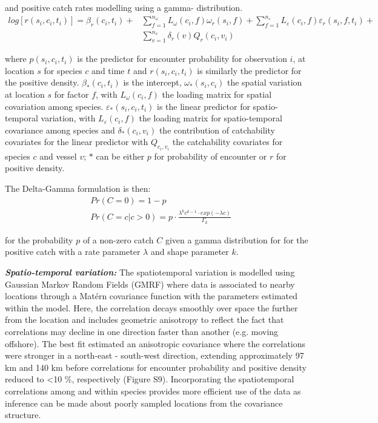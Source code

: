 \documentclass{nature}
\begin{document}
\begin{linenumbers}
and positive catch rates modelling using a gamma- distribution\cite{Thorson2015a}. 
		\begin{equation}
			\begin{split}
			log[r(s_{i},c_{i},t_{i})] = \beta_{r}(c_{i},t_{i}) +
			& \sum\limits_{f=1}^{n_{\omega}} L_{\omega}(c_{i},f)
			\omega_{r}(s_{i},f) +\sum\limits_{f=1}^{n_{\varepsilon}} 
			L_{\varepsilon}(c_{i},f) \varepsilon_{r}(s_{i},f,t_{i}) + \\
			& \sum\limits_{v=1}^{n_{v}}\delta_{r}(v) Q_{r}(c_{i}, v_{i})
			\end{split}
		\end{equation}

where $p(s_{i}, c_{i}, t_{i})$ is the predictor for encounter probability for
observation $i$, at location $s$ for species $c$ and time $t$ and $r(s_{i},
c_{i}, t_{i})$ is similarly the predictor for the positive density.
$\beta_{*}(c_{i},t_{i})$ is the intercept, $\omega_{*}(s_{i},c_{i})$ the
spatial variation at location $s$ for factor $f$, with $L_{\omega}(c_{i},f)$
the loading matrix for spatial covariation among species.
$\varepsilon_{*}(s_{i},c_{i},t_{i})$ is the linear predictor for
spatio-temporal variation, with $L_{\varepsilon}(c_{i}, f)$ the loading matrix
for spatio-temporal covariance among species and $\delta_{*}(c_{i}, v_{i})$ the
contribution of catchability covariates for the linear predictor with
$Q_{c_{i}, v_{i}}$ the catchability covariates for species $c$ and vessel $v$;
$*$ can be either $p$ for probability of encounter or $r$ for positive density.

The Delta-Gamma formulation is then:
\begin{equation}
	\begin{split}
	& Pr(C = 0) = 1 - p \\
	& Pr(C = c | c > 0) = p \cdot \frac{\lambda^{k}c^{k-1} \cdot exp(-\lambda c)}{\Gamma_{k}}
	\end{split}
\end{equation}

for the probability $p$ of a non-zero catch $C$ given a gamma distribution for
for the positive catch with a rate parameter $\lambda$ and shape parameter $k$.

\textbf{\textit{Spatio-temporal variation:}} The spatiotemporal variation is
modelled using Gaussian Markov Random Fields (GMRF) where data is associated to
nearby locations through a Matérn covariance function with the parameters
estimated within the model. Here, the correlation decays smoothly over space
the further from the location and includes geometric anisotropy to reflect the
fact that correlations may decline in one direction faster than another (e.g.
moving offshore)\cite{Thorson2013}.  The best fit estimated an anisotropic
covariance where the correlations were stronger in a north-east - south-west
direction, extending approximately 97 km and 140 km before correlations for
encounter probability and positive density reduced to \textless 10 \%,
respectively (Figure S9).  Incorporating the spatiotemporal correlations among
and within species provides more efficient use of the data as inference
can be made about poorly sampled locations from the covariance structure.


\end{linenumbers}
\end{document}
